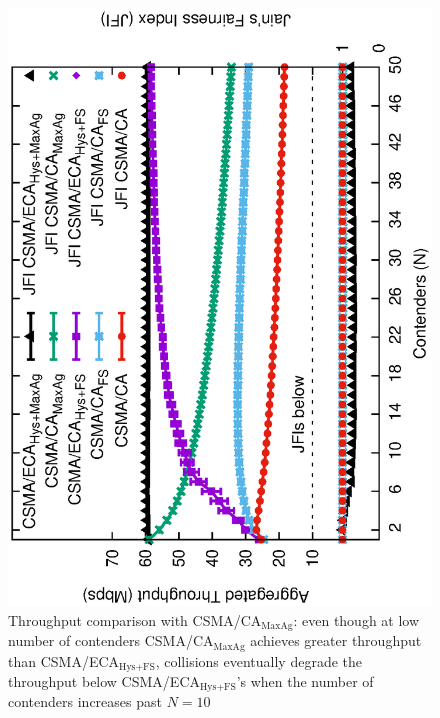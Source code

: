 \documentclass[a4paper,journal]{IEEEtran}
\providecommand{\DIFaddbegin}{} %
\providecommand{\DIFaddend}{} %
\providecommand{\DIFaddbeginFL}{} %
\providecommand{\DIFaddendFL}{} %
\providecommand{\DIFdelbeginFL}{} %
\providecommand{\DIFdelendFL}{} %
\begin{document}
	\DIFaddbegin 

	\DIFaddend \begin{figure}[tb]
	\centering
		\DIFdelbeginFL %
\DIFdelendFL \DIFaddbeginFL \includegraphics[width=0.7\linewidth,angle=-90]{figures/throughput-max-Ag/throughput-saturated-maxAgg-TON.eps}
		\DIFaddendFL \caption{Throughput comparison with CSMA/CA$_{\text{MaxAg}}$: even though at low number of contenders CSMA/CA$_{\text{MaxAg}}$ achieves greater throughput than CSMA/ECA$_{\text{Hys+FS}}$, collisions eventually degrade the throughput below CSMA/ECA$_{\text{Hys+FS}}$'s when the number of contenders increases past $N=10$}
		\label{fig:ECA-vs-DCF-maxAgg}
	\end{figure}
\end{document}
